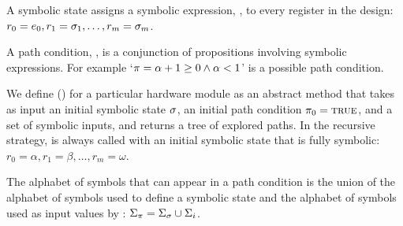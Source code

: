A symbolic state assigns a symbolic expression, \symexpression, to every register in the design: $r_0 =
e_0, r_1 = \sigma_1, \ldots, r_m = \sigma_m$. 

A path condition, \pathcondition, is a conjunction of propositions involving
symbolic expressions. For example `$\pi = \alpha + 1 \ge 0 \wedge \alpha < 1$' is a
possible path condition.

We define \symexecution() for a particular hardware module as an abstract method
that takes as input an initial symbolic
state $\sigma$, an initial path condition $\pi_0 = \mathtt{\textsc{true}}$, and a
set of symbolic inputs, and 
returns a tree of explored paths. In the recursive strategy, \symexecution{} is
always called with an initial
symbolic state that is fully symbolic: $r_0 = \alpha, r_1 = \beta, \ldots, r_m = \omega$.



The alphabet of symbols that can appear in a path condition is the union of the
alphabet of symbols used to define a symbolic state and the alphabet of symbols
used as input values by \symexecution{}: $\Sigma_{\pi} = \Sigma_{\sigma} \cup \Sigma_i$.




